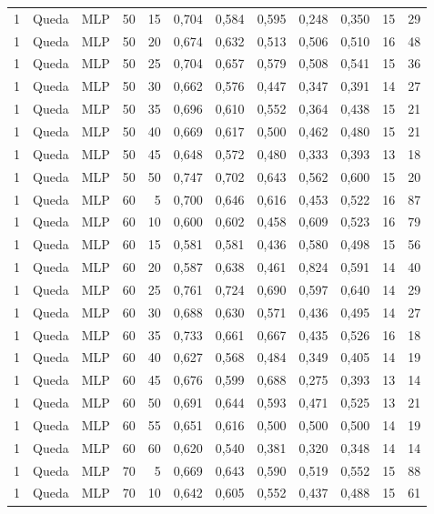 \begin{longtable}{@{}rllrrrrrrrrr@{}}
1 & Queda & MLP & 50 & 15 & 0,704 & 0,584 & 0,595 & 0,248 & 0,350 & 15 & 29 \\
1 & Queda & MLP & 50 & 20 & 0,674 & 0,632 & 0,513 & 0,506 & 0,510 & 16 & 48 \\
1 & Queda & MLP & 50 & 25 & 0,704 & 0,657 & 0,579 & 0,508 & 0,541 & 15 & 36 \\
1 & Queda & MLP & 50 & 30 & 0,662 & 0,576 & 0,447 & 0,347 & 0,391 & 14 & 27 \\
1 & Queda & MLP & 50 & 35 & 0,696 & 0,610 & 0,552 & 0,364 & 0,438 & 15 & 21 \\
1 & Queda & MLP & 50 & 40 & 0,669 & 0,617 & 0,500 & 0,462 & 0,480 & 15 & 21 \\
1 & Queda & MLP & 50 & 45 & 0,648 & 0,572 & 0,480 & 0,333 & 0,393 & 13 & 18 \\
1 & Queda & MLP & 50 & 50 & 0,747 & 0,702 & 0,643 & 0,562 & 0,600 & 15 & 20 \\
1 & Queda & MLP & 60 & 5 & 0,700 & 0,646 & 0,616 & 0,453 & 0,522 & 16 & 87 \\
1 & Queda & MLP & 60 & 10 & 0,600 & 0,602 & 0,458 & 0,609 & 0,523 & 16 & 79 \\
1 & Queda & MLP & 60 & 15 & 0,581 & 0,581 & 0,436 & 0,580 & 0,498 & 15 & 56 \\
1 & Queda & MLP & 60 & 20 & 0,587 & 0,638 & 0,461 & 0,824 & 0,591 & 14 & 40 \\
1 & Queda & MLP & 60 & 25 & 0,761 & 0,724 & 0,690 & 0,597 & 0,640 & 14 & 29 \\
1 & Queda & MLP & 60 & 30 & 0,688 & 0,630 & 0,571 & 0,436 & 0,495 & 14 & 27 \\
1 & Queda & MLP & 60 & 35 & 0,733 & 0,661 & 0,667 & 0,435 & 0,526 & 16 & 18 \\
1 & Queda & MLP & 60 & 40 & 0,627 & 0,568 & 0,484 & 0,349 & 0,405 & 14 & 19 \\
1 & Queda & MLP & 60 & 45 & 0,676 & 0,599 & 0,688 & 0,275 & 0,393 & 13 & 14 \\
1 & Queda & MLP & 60 & 50 & 0,691 & 0,644 & 0,593 & 0,471 & 0,525 & 13 & 21 \\
1 & Queda & MLP & 60 & 55 & 0,651 & 0,616 & 0,500 & 0,500 & 0,500 & 14 & 19 \\
1 & Queda & MLP & 60 & 60 & 0,620 & 0,540 & 0,381 & 0,320 & 0,348 & 14 & 14 \\
1 & Queda & MLP & 70 & 5 & 0,669 & 0,643 & 0,590 & 0,519 & 0,552 & 15 & 88 \\
1 & Queda & MLP & 70 & 10 & 0,642 & 0,605 & 0,552 & 0,437 & 0,488 & 15 & 61 \\

\end{longtable}
